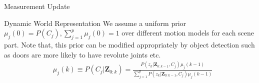\documentclass[final]{beamer}
\newlength{\onecolwid}
\begin{document}
\begin{frame}[t]
\begin{columns}[t]
\begin{column}{\onecolwid}
\begin{block} {Measurement Update}
      \end{block}

      \begin{block}{Dynamic World Representation} 
        We assume a uniform prior $\mu_j(0) = P(C_j), \sum_{j=1}^{p}\mu_j(0) = 1$ over different motion models for each scene part. Note that, this prior can be modified appropriately by object detection such as doors are more likely to have revolute joints etc. 
        \begin{align*}
          & \mu_j(k) \equiv P(C_j|\mathbf{Z}_{0:k})  = 
          \frac{P(z_k|\mathbf{Z}_{0:k-1}, C_j)\mu_j(k-1)}{\sum_{j=1}^{p} P(z_k|\mathbf{Z}_{0:k-1}, C_j)\mu_j(k-1) }
        \end{align*}
      \end{block}


\end{column}
\end{columns}
\end{frame}
\end{document}
